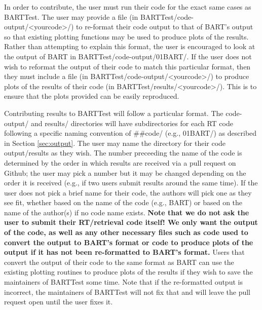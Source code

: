 \documentclass[letterpaper, 12pt]{article}
\begin{document}
In order to contribute, the user must run their code for the exact 
same cases as BARTTest. The user may provide a file 
(in BARTTest/code-output/{\textless}yourcode{\textgreater}/) to re-format 
their code output to that of BART's output so that existing plotting functions 
may be used to produce plots of the results. Rather than attempting 
to explain this format, the user is encouraged to look at the output of BART 
in BARTTest/code-output/01BART/. If the user does not wish to reformat the 
output of their code to match this particular format, then they must include a 
file (in BARTTest/code-output/{\textless}yourcode{\textgreater}/) to produce 
plots of the results of their code 
(in BARTTest/results/{\textless}yourcode{\textgreater}/). 
This is to ensure that the plots provided can be easily reproduced.

Contributing results to BARTTest will follow a particular format. The 
code-output/ and results/ directories will have subdirectories for each RT 
code following a specific naming convention of {\#}{\#}code/ (e.g., 01BART/) as 
described in Section \ref{sec:output}. The user may name the directory for 
their code output/results as they wish. The number 
preceeding the name of the code is determined by the order 
in which results are received via a pull request on Github; the user may pick 
a number but it may be changed depending on the order it is received (e.g., if 
two users submit results around the same time). If the user does not pick 
a brief name for their code, the authors will pick one as they see fit, 
whether based on the name of the code (e.g., BART) or based on the name of 
the author(s) if no code name exists. \textbf{Note that we do not ask the user 
to submit their RT/retrieval code itself! We only want the output of the code, 
as well as any other necessary files such as code used to convert the output 
to BART's format or code to produce plots of the output if it has not been 
re-formatted to BART's format.} Users that convert the output of their code 
to the same format as BART can use the existing plotting routines to produce 
plots of the results if they wish to save the maintainers of BARTTest some 
time.  Note that if the re-formatted output is incorrect, the maintainers of 
BARTTest will not fix that and will leave the pull request open until the user 
fixes it.
\end{document}
